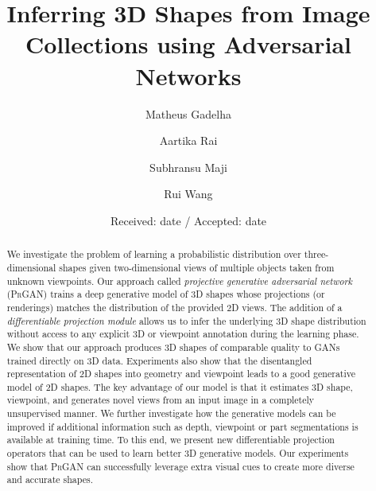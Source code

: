 \documentclass[twocolumn]{svjour3}          %
\newcommand{\prgan}{\textsc{PrGAN}\xspace}
\begin{document}
\title{Inferring 3D Shapes from Image Collections using Adversarial Networks%
}


\author{Matheus Gadelha \and
        Aartika Rai  \and
        Subhransu Maji  \and
        Rui Wang
}



\date{Received: date / Accepted: date}


\maketitle


\begin{abstract}
We investigate the problem of learning a probabilistic distribution over
three-dimensional shapes given two-dimensional views of multiple
objects taken from unknown viewpoints.
Our approach called \emph{projective generative adversarial network}
(\prgan) trains a deep generative model of 3D shapes whose projections
(or renderings) matches the distribution of the provided 2D views.
The addition of a \emph{differentiable projection
module} allows us to infer the underlying 3D shape distribution without
access to any explicit 3D or viewpoint annotation during the learning
phase. 
We show that our approach produces 3D shapes of comparable
quality to GANs trained directly on 3D data. %
Experiments also show that the
disentangled representation of 2D shapes into geometry and viewpoint
leads to a good generative model of 2D shapes.
The key advantage of our model is that it estimates 3D shape, viewpoint, and generates novel
views from an input image in a completely unsupervised manner.
We further investigate how the generative models can be improved
if additional information such as depth, viewpoint or part
segmentations is available at training time.
To this end, we present new differentiable projection operators that can be
used to learn better 3D generative models.
Our experiments show that \prgan can successfully leverage extra visual cues
to create more diverse and accurate shapes.
\end{abstract}











\end{document}
